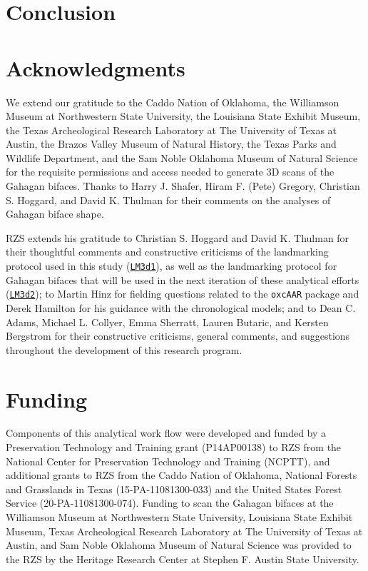 \documentclass[]{interact}
\theoremstyle{plain}%
\theoremstyle{definition}
\theoremstyle{remark}
\begin{document}
\hypertarget{conclusion}{%
\section{Conclusion}\label{conclusion}}

\hypertarget{acknowledgments}{%
\section*{Acknowledgments}\label{acknowledgments}}

We extend our gratitude to the Caddo Nation of Oklahoma, the Williamson
Museum at Northwestern State University, the Louisiana State Exhibit
Museum, the Texas Archeological Research Laboratory at The University of
Texas at Austin, the Brazos Valley Museum of Natural History, the Texas
Parks and Wildlife Department, and the Sam Noble Oklahoma Museum of
Natural Science for the requisite permissions and access needed to
generate 3D scans of the Gahagan bifaces. Thanks to Harry J. Shafer,
Hiram F. (Pete) Gregory, Christian S. Hoggard, and David K. Thulman for
their comments on the analyses of Gahagan biface shape.

RZS extends his gratitude to Christian S. Hoggard and David K. Thulman
for their thoughtful comments and constructive criticisms of the
landmarking protocol used in this study
(\href{https://github.com/aksel-blaise/gahaganmorph2/blob/master/analysis/landmarking-protocol.md}{\texttt{LM3d1}}),
as well as the landmarking protocol for Gahagan bifaces that will be
used in the next iteration of these analytical efforts
(\href{https://seldenlab.github.io/gahaganmorph.3/landmarking-protocol-3d2.html}{\texttt{LM3d2}});
to Martin Hinz for fielding questions related to the \texttt{oxcAAR}
package and Derek Hamilton for his guidance with the chronological
models; and to Dean C. Adams, Michael L. Collyer, Emma Sherratt, Lauren
Butaric, and Kersten Bergstrom for their constructive criticisms,
general comments, and suggestions throughout the development of this
research program.

\hypertarget{funding}{%
\section*{Funding}\label{funding}}

Components of this analytical work flow were developed and funded by a
Preservation Technology and Training grant (P14AP00138) to RZS from the
National Center for Preservation Technology and Training (NCPTT), and
additional grants to RZS from the Caddo Nation of Oklahoma, National
Forests and Grasslands in Texas (15-PA-11081300-033) and the United
States Forest Service (20-PA-11081300-074). Funding to scan the Gahagan
bifaces at the Williamson Museum at Northwestern State University,
Louisiana State Exhibit Museum, Texas Archeological Research Laboratory
at The University of Texas at Austin, and Sam Noble Oklahoma Museum of
Natural Science was provided to the RZS by the Heritage Research Center
at Stephen F. Austin State University.
\end{document}

